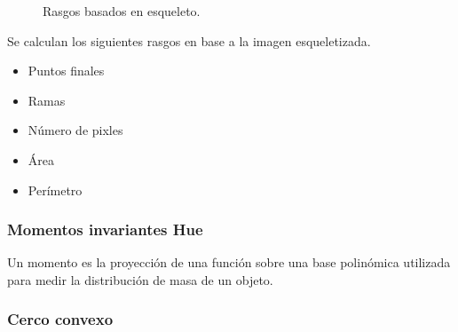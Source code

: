 \documentclass[a4paper, 11pt]{article}
\begin{document}
\begin{figure}[ht]%
    \centering
    \qquad
    \caption{Rasgos basados en esqueleto.}%
    \label{entropia}%
\end{figure}

Se calculan los siguientes rasgos en base a la imagen esqueletizada.

\begin{itemize}
\item Puntos finales
\item Ramas
\item Número de pixles
\item Área
\item Perímetro
\end{itemize}

\subsubsection{Momentos invariantes Hue}

Un momento es la proyección de una función sobre una base polinómica utilizada para medir la distribución de masa de un objeto.

\subsubsection{Cerco convexo}
\end{document}
